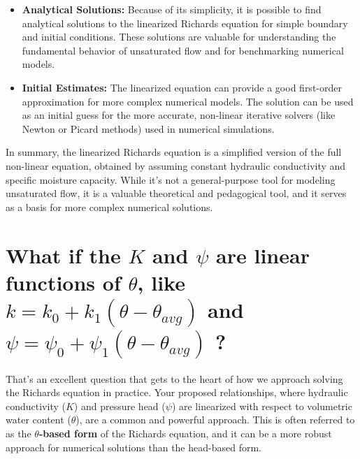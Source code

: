 \documentclass[
]{article}
\begin{document}
\begin{itemize}
\item
  \textbf{Analytical Solutions:} Because of its simplicity, it is
  possible to find analytical solutions to the linearized Richards
  equation for simple boundary and initial conditions. These solutions
  are valuable for understanding the fundamental behavior of unsaturated
  flow and for benchmarking numerical models.
\item
  \textbf{Initial Estimates:} The linearized equation can provide a good
  first-order approximation for more complex numerical models. The
  solution can be used as an initial guess for the more accurate,
  non-linear iterative solvers (like Newton or Picard methods) used in
  numerical simulations.
\end{itemize}

In summary, the linearized Richards equation is a simplified version of
the full non-linear equation, obtained by assuming constant hydraulic
conductivity and specific moisture capacity. While it's not a
general-purpose tool for modeling unsaturated flow, it is a valuable
theoretical and pedagogical tool, and it serves as a basis for more
complex numerical solutions.

\hypertarget{what-if-the-k-and-psi-are-linear-functions-of-theta-like-kk_0-k_1-theta---theta_avg-and-psi-psi_0-psi_1-theta---theta_avg}{%
\section{\texorpdfstring{What if the \(K\) and \(\psi\) are linear
functions of \(\theta\), like \(k=k_0 + k_1 (\theta - \theta_{avg})\)
and \(\psi = \psi_0 + \psi_1 (\theta - \theta_{avg})\)
?}{What if the K and \textbackslash psi are linear functions of \textbackslash theta, like k=k\_0 + k\_1 (\textbackslash theta - \textbackslash theta\_\{avg\}) and \textbackslash psi = \textbackslash psi\_0 + \textbackslash psi\_1 (\textbackslash theta - \textbackslash theta\_\{avg\}) ?}}\label{what-if-the-k-and-psi-are-linear-functions-of-theta-like-kk_0-k_1-theta---theta_avg-and-psi-psi_0-psi_1-theta---theta_avg}}

That's an excellent question that gets to the heart of how we approach
solving the Richards equation in practice. Your proposed relationships,
where hydraulic conductivity (\(K\)) and pressure head (\(\psi\)) are
linearized with respect to volumetric water content (\(\theta\)), are a
common and powerful approach. This is often referred to as the
\textbf{\(\theta\)-based form} of the Richards equation, and it can be a
more robust approach for numerical solutions than the head-based form.
\end{document}
